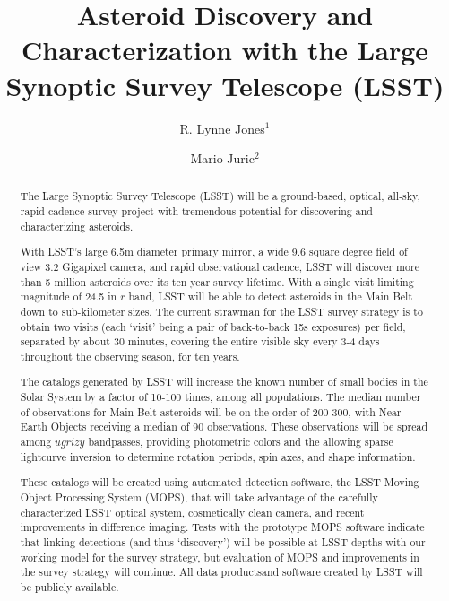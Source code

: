\documentclass{iau}
\title[Asteroids in LSST] %
{Asteroid Discovery and Characterization with the Large Synoptic Survey Telescope (LSST)}
\author[R. Lynne Jones \& Mario Juric]   %
{R. Lynne Jones$^1$
 \and Mario Juric$^2$}
\affiliation{$^1$University of Washington\\ email: {\tt lynnej@uw.edu} \\[\affilskip]
$^2$University of Washington \\email: {\tt mjuric@astro.astro.washington.edu}}
\begin{document}
\maketitle

\begin{abstract}
The Large Synoptic Survey Telescope (LSST) will be a ground-based,
optical, all-sky, rapid cadence survey project with tremendous
potential for discovering and characterizing asteroids.

With LSST's large 6.5m diameter primary mirror, a wide 9.6 square
degree field of view 3.2 Gigapixel camera, and rapid observational
cadence, LSST will discover more than 5 million asteroids over its ten
year survey lifetime. With a single visit limiting magnitude of 24.5
in $r$ band, LSST will be able to detect asteroids in the Main Belt
down to sub-kilometer sizes.  The current strawman for the LSST survey
strategy is to obtain two visits (each `visit' being a pair of
back-to-back 15s exposures) per field, separated by about 30 minutes,
covering the entire visible sky every 3-4 days throughout the
observing season, for ten years.

The catalogs generated by LSST will increase the known number of small
bodies in the Solar System by a factor of 10-100 times, among all
populations. The median number of observations for Main Belt asteroids
will be on the order of 200-300, with Near Earth Objects receiving a
median of 90 observations. These observations will be spread among
$ugrizy$ bandpasses, providing photometric colors and the allowing
sparse lightcurve inversion to determine rotation periods, spin axes, and shape information.

These catalogs will be created using automated detection software, the
LSST Moving Object Processing System (MOPS), that will take advantage
of the carefully characterized LSST optical system, cosmetically
clean camera, and recent improvements in difference imaging. Tests
with the prototype MOPS software indicate that linking detections (and thus
`discovery') will be possible at LSST depths with our working
model for the survey strategy, but evaluation of MOPS and improvements
in the survey strategy will continue. All data productsand software created by
LSST will be publicly available.
\end{abstract}

\firstsection %
\end{document}
